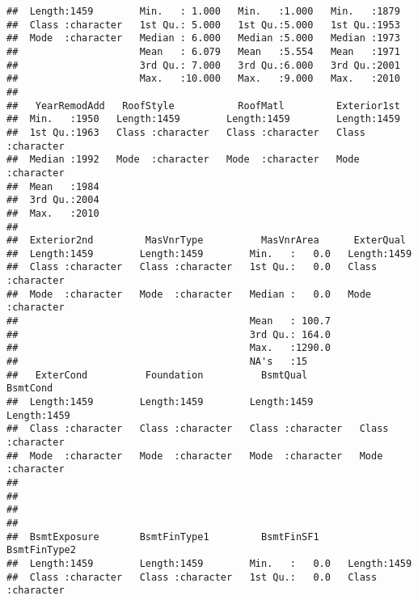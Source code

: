 \documentclass[
]{article}
\begin{document}
\begin{verbatim}
##  Length:1459        Min.   : 1.000   Min.   :1.000   Min.   :1879  
##  Class :character   1st Qu.: 5.000   1st Qu.:5.000   1st Qu.:1953  
##  Mode  :character   Median : 6.000   Median :5.000   Median :1973  
##                     Mean   : 6.079   Mean   :5.554   Mean   :1971  
##                     3rd Qu.: 7.000   3rd Qu.:6.000   3rd Qu.:2001  
##                     Max.   :10.000   Max.   :9.000   Max.   :2010  
##                                                                    
##   YearRemodAdd   RoofStyle           RoofMatl         Exterior1st       
##  Min.   :1950   Length:1459        Length:1459        Length:1459       
##  1st Qu.:1963   Class :character   Class :character   Class :character  
##  Median :1992   Mode  :character   Mode  :character   Mode  :character  
##  Mean   :1984                                                           
##  3rd Qu.:2004                                                           
##  Max.   :2010                                                           
##                                                                         
##  Exterior2nd         MasVnrType          MasVnrArea      ExterQual        
##  Length:1459        Length:1459        Min.   :   0.0   Length:1459       
##  Class :character   Class :character   1st Qu.:   0.0   Class :character  
##  Mode  :character   Mode  :character   Median :   0.0   Mode  :character  
##                                        Mean   : 100.7                     
##                                        3rd Qu.: 164.0                     
##                                        Max.   :1290.0                     
##                                        NA's   :15                         
##   ExterCond          Foundation          BsmtQual           BsmtCond        
##  Length:1459        Length:1459        Length:1459        Length:1459       
##  Class :character   Class :character   Class :character   Class :character  
##  Mode  :character   Mode  :character   Mode  :character   Mode  :character  
##                                                                             
##                                                                             
##                                                                             
##                                                                             
##  BsmtExposure       BsmtFinType1         BsmtFinSF1     BsmtFinType2      
##  Length:1459        Length:1459        Min.   :   0.0   Length:1459       
##  Class :character   Class :character   1st Qu.:   0.0   Class :character  

\end{verbatim}
\end{document}
